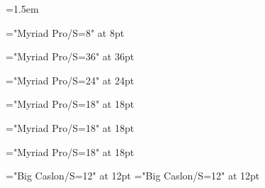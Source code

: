 \emergencystretch=1.5em

\def\displayfontname{Myriad Pro}
\def\bodyfontname{Big Caslon}
\def\bodyfontsize{12}
\def\leading{16pt}
\baselineskip=\leading

\def\pageheaderfontname{\displayfontname}
\def\pageheaderfontsize{8}
\font\pageheaderfont="\pageheaderfontname/S=\pageheaderfontsize" at \pageheaderfontsize pt
\def\pagefooterfont{\pageheaderfont}

\def\titlepagetitlefontname{\displayfontname}
\def\titlepagetitlefontsize{36}
\font\titlepagetitlefont="\titlepagetitlefontname/S=\titlepagetitlefontsize" at \titlepagetitlefontsize pt

\def\titlepageauthorfontname{\displayfontname}
\def\titlepageauthorfontsize{24}
\font\titlepageauthorfont="\titlepageauthorfontname/S=\titlepageauthorfontsize" at \titlepageauthorfontsize pt

\def\titlepagepublisherfontname{\displayfontname}
\def\titlepagepublisherfontsize{18}
\font\titlepagepublisherfont="\titlepagepublisherfontname/S=\titlepagepublisherfontsize" at \titlepagepublisherfontsize pt

\def\infopagetitlefontname{\displayfontname}
\def\infopagetitlefontsize{18}
\font\infopagetitlefont="\infopagetitlefontname/S=\infopagetitlefontsize" at \infopagetitlefontsize pt

\def\sectiontitlefontname{\displayfontname}
\def\sectiontitlefontsize{18}
\font\sectiontitlefont="\displayfontname/S=\sectiontitlefontsize" at \sectiontitlefontsize pt

\font\bodyfont="\bodyfontname/S=\bodyfontsize" at \bodyfontsize pt
\font\leadinfont="\bodyfontname/S=\bodyfontsize" at \bodyfontsize pt

\def\leadin#1{{\leadinstyle#1}}
\def\leadinstyle{\noindent\leadinfont}

\def\emph#1{{\it #1}}

\raggedbottom
